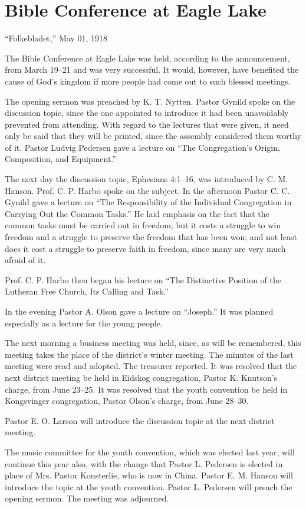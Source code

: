 \section{Bible Conference at Eagle Lake}

“Folkebladet,” May 01, 1918

The Bible Conference at Eagle Lake was held, according to the announcement, from March 19–21 and was very successful. It would, however, have benefited the cause of God’s kingdom if more people had come out to such blessed meetings.

The opening sermon was preached by K. T. Nytten. Pastor Gynild spoke on the discussion topic, since the one appointed to introduce it had been unavoidably prevented from attending. With regard to the lectures that were given, it need only be said that they will be printed, since the assembly considered them worthy of it. Pastor Ludvig Pedersen gave a lecture on “The Congregation’s Origin, Composition, and Equipment.”

The next day the discussion topic, Ephesians 4:1–16, was introduced by C. M. Hanson. Prof. C. P. Harbo spoke on the subject. In the afternoon Pastor C. C. Gynild gave a lecture on “The Responsibility of the Individual Congregation in Carrying Out the Common Tasks.” He laid emphasis on the fact that the common tasks must be carried out in freedom; but it costs a struggle to win freedom and a struggle to preserve the freedom that has been won; and not least does it cost a struggle to preserve faith in freedom, since many are very much afraid of it.

Prof. C. P. Harbo then began his lecture on “The Distinctive Position of the Lutheran Free Church, Its Calling and Task.”

In the evening Pastor A. Olson gave a lecture on “Joseph.” It was planned especially as a lecture for the young people.

The next morning a business meeting was held, since, as will be remembered, this meeting takes the place of the district’s winter meeting. The minutes of the last meeting were read and adopted. The treasurer reported. It was resolved that the next district meeting be held in Eidskog congregation, Pastor K. Knutson’s charge, from June 23–25. It was resolved that the youth convention be held in Kongsvinger congregation, Pastor Olson’s charge, from June 28–30.

Pastor E. O. Larson will introduce the discussion topic at the next district meeting.

The music committee for the youth convention, which was elected last year, will continue this year also, with the change that Pastor L. Pedersen is elected in place of Mrs. Pastor Konsterlie, who is now in China. Pastor E. M. Hanson will introduce the topic at the youth convention. Pastor L. Pedersen will preach the opening sermon. The meeting was adjourned.

